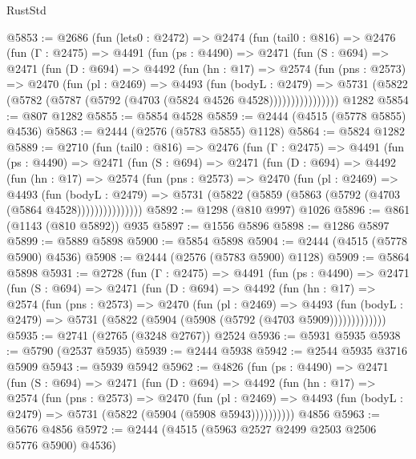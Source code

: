 \begin{lexlean}{RustStd}
\begin{coremodule}
@5853 := @2686
    (fun (lets0 : @2472) =>
    @2474
      (fun (tail0 : @816) =>
      @2476
        (fun (Γ : @2475) =>
        @4491
          (fun (ps : @4490) =>
          @2471
            (fun (S : @694) =>
            @2471
              (fun (D : @694) =>
              @4492
                (fun (hn : @17) =>
                @2574
                  (fun (pns : @2573) =>
                  @2470
                    (fun (pl : @2469) =>
                    @4493
                      (fun (bodyL : @2479) =>
                      @5731 (@5822 (@5782 (@5787 (@5792 (@4703 (@5824 @4526 @4528))))))))))))))))
    @1282
@5854 := @807 @1282
@5855 := @5854 @4528
@5859 := @2444 (@4515 (@5778 @5855) @4536)
@5863 := @2444 (@2576 (@5783 @5855) @1128)
@5864 := @5824 @1282
@5889 := @2710
    (fun (tail0 : @816) =>
    @2476
      (fun (Γ : @2475) =>
      @4491
        (fun (ps : @4490) =>
        @2471
          (fun (S : @694) =>
          @2471
            (fun (D : @694) =>
            @4492
              (fun (hn : @17) =>
              @2574
                (fun (pns : @2573) =>
                @2470
                  (fun (pl : @2469) =>
                  @4493
                    (fun (bodyL : @2479) =>
                    @5731 (@5822 (@5859 (@5863 (@5792 (@4703 (@5864 @4528)))))))))))))))
@5892 := @1298 (@810 @997) @1026
@5896 := @861 (@1143 (@810 @5892)) @935
@5897 := @1556 @5896
@5898 := @1286 @5897
@5899 := @5889 @5898
@5900 := @5854 @5898
@5904 := @2444 (@4515 (@5778 @5900) @4536)
@5908 := @2444 (@2576 (@5783 @5900) @1128)
@5909 := @5864 @5898
@5931 := @2728
    (fun (Γ : @2475) =>
    @4491
      (fun (ps : @4490) =>
      @2471
        (fun (S : @694) =>
        @2471
          (fun (D : @694) =>
          @4492
            (fun (hn : @17) =>
            @2574
              (fun (pns : @2573) =>
              @2470
                (fun (pl : @2469) =>
                @4493
                  (fun (bodyL : @2479) =>
                  @5731 (@5822 (@5904 (@5908 (@5792 (@4703 @5909)))))))))))))
@5935 := @2741 (@2765 (@3248 @2767)) @2524
@5936 := @5931 @5935
@5938 := @5790 (@2537 @5935)
@5939 := @2444 @5938
@5942 := @2544 @5935 @3716 @5909
@5943 := @5939 @5942
@5962 := @4826
    (fun (ps : @4490) =>
    @2471
      (fun (S : @694) =>
      @2471
        (fun (D : @694) =>
        @4492
          (fun (hn : @17) =>
          @2574
            (fun (pns : @2573) =>
            @2470
              (fun (pl : @2469) =>
              @4493 (fun (bodyL : @2479) => @5731 (@5822 (@5904 (@5908 @5943))))))))))
    @4856
@5963 := @5676 @4856
@5972 := @2444 (@4515 (@5963 @2527 @2499 @2503 @2506 @5776 @5900) @4536)

\end{coremodule}
\end{lexlean}

